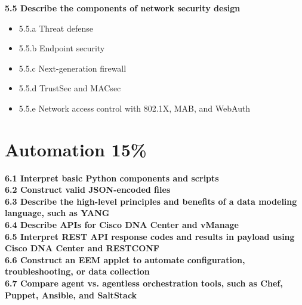 \documentclass{article}
\begin{document}
\noindent\textbf{5.5 Describe the components of network security design}
\begin{itemize}
\item 5.5.a Threat defense
\item 5.5.b Endpoint security
\item 5.5.c Next-generation firewall
\item 5.5.d TrustSec and MACsec
\item 5.5.e Network access control with 802.1X, MAB, and WebAuth
\end{itemize}

\newpage
\section{Automation 15\%}
\noindent\textbf{6.1 Interpret basic Python components and scripts}\\
\noindent\textbf{6.2 Construct valid JSON-encoded files}\\
\noindent\textbf{6.3 Describe the high-level principles and benefits of a data modeling language, such as YANG}\\
\noindent\textbf{6.4 Describe APIs for Cisco DNA Center and vManage}\\
\noindent\textbf{6.5 Interpret REST API response codes and results in payload using Cisco DNA Center and RESTCONF}\\
\noindent\textbf{6.6 Construct an EEM applet to automate configuration, troubleshooting, or data collection}\\
\noindent\textbf{6.7 Compare agent vs. agentless orchestration tools, such as Chef, Puppet, Ansible, and SaltStack}\\
\end{document}
